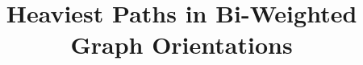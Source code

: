 \documentclass[a4paper,12pt]{article}
\begin{document}
	
	

\author{}
\title{Heaviest Paths in Bi-Weighted Graph Orientations}
\date{}


\newcommand{\comments}[1]{}
\newcommand{\dir}[1][G]{\stackrel{\rightarrow}{#1}}

\maketitle




\end{document}
